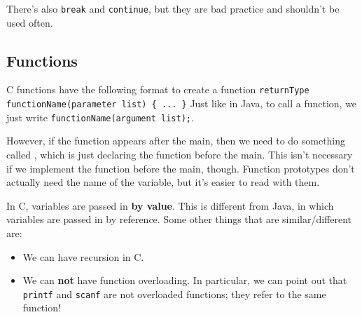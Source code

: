There's also \verb!break! and \verb!continue!, but they are bad practice and shouldn't be used often.


\subsection{Functions}
C functions have the following format to create a function \verb!returnType functionName(parameter list) { ... }! Just like in Java, to call a function, we just write \verb!functionName(argument list);!. 

However, if the function appears after the main, then we need to do something called , which is just declaring the function before the main. This isn't necessary if we implement the function before the main, though. Function prototypes don't actually need the name of the variable, but it's easier to read with them.


In C, variables are passed in \textbf{by value}. This is different from Java, in which variables are passed in by reference. Some other things that are similar/different are: \begin{itemize}
    \item We can have recursion in C.
    \item We can \textbf{not} have function overloading. In particular, we can point out that \verb!printf! and \verb!scanf! are not overloaded functions; they refer to the same function!
\end{itemize}

